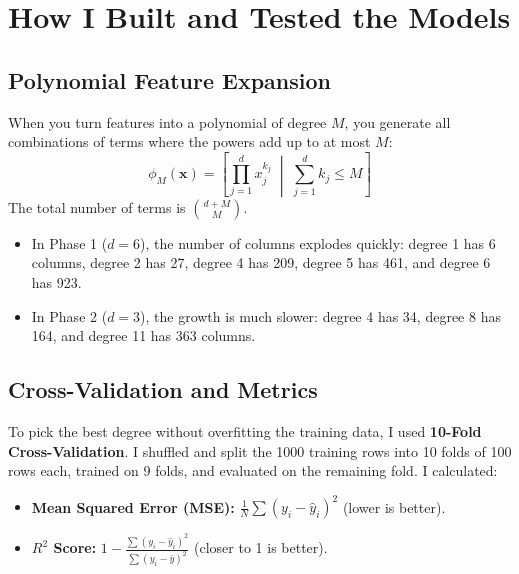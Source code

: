 \documentclass[11pt]{article}
\begin{document}
\section{How I Built and Tested the Models}

\subsection{Polynomial Feature Expansion}
When you turn features into a polynomial of degree $M$, you generate all combinations of terms where the powers add up to at most $M$:
\begin{equation}
\phi_M(\mathbf{x}) = \left[ \prod_{j=1}^d x_j^{k_j} \;\middle|\; \sum_{j=1}^d k_j \le M \right]
\end{equation}
The total number of terms is $\binom{d + M}{M}$.
\begin{itemize}\itemsep 0pt
    \item In Phase 1 ($d=6$), the number of columns explodes quickly: degree 1 has 6 columns, degree 2 has 27, degree 4 has 209, degree 5 has 461, and degree 6 has 923.
    \item In Phase 2 ($d=3$), the growth is much slower: degree 4 has 34, degree 8 has 164, and degree 11 has 363 columns.
\end{itemize}

\subsection{Cross-Validation and Metrics}
To pick the best degree without overfitting the training data, I used \textbf{10-Fold Cross-Validation}. I shuffled and split the 1000 training rows into 10 folds of 100 rows each, trained on 9 folds, and evaluated on the remaining fold. I calculated:
\begin{itemize}\itemsep 0pt
    \item \textbf{Mean Squared Error (MSE):} $\frac{1}{N}\sum (y_i - \hat{y}_i)^2$ (lower is better).
    \item \textbf{$R^2$ Score:} $1 - \frac{\sum (y_i - \hat{y}_i)^2}{\sum (y_i - \bar{y})^2}$ (closer to 1 is better).
\end{itemize}
\end{document}
